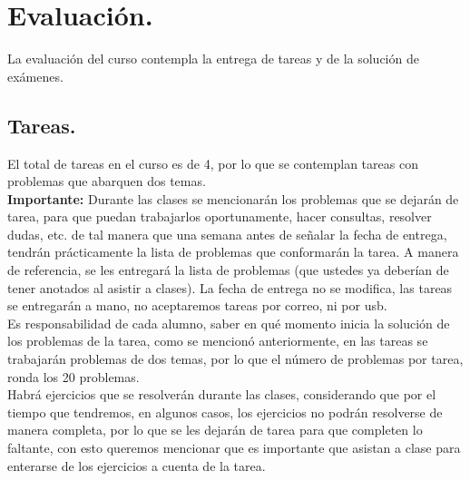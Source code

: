 \documentclass[12pt]{article}
\begin{document}
\section{Evaluación.}
La evaluación del curso contempla la entrega de tareas y de la solución de exámenes.
\subsection{Tareas.}
El total de tareas en el curso es de 4, por lo que se contemplan tareas con problemas que abarquen dos temas. \\
\textbf{Importante: } Durante las clases se mencionarán los problemas que se dejarán de tarea, para que puedan trabajarlos oportunamente, hacer consultas, resolver dudas, etc. de tal manera que una semana antes de señalar la fecha de entrega, tendrán prácticamente la lista de problemas que conformarán la tarea. A manera de referencia, se les entregará la lista de problemas (que ustedes ya deberían de tener anotados al asistir a clases). La fecha de entrega no se modifica, las tareas se entregarán a mano, no aceptaremos tareas por correo, ni por usb.
\\
Es responsabilidad de cada alumno, saber en qué momento inicia la solución de los problemas de la tarea, como se mencionó anteriormente, en las tareas se trabajarán problemas de dos temas, por lo que el número de problemas por tarea, ronda los 20 problemas.
\\
Habrá ejercicios que se resolverán durante las clases, considerando que por el tiempo que tendremos, en algunos casos, los ejercicios no podrán resolverse de manera completa, por lo que se les dejarán de tarea para que completen lo faltante, con esto queremos mencionar que es importante que asistan a clase para enterarse de los ejercicios a cuenta de la tarea.
\end{document}
